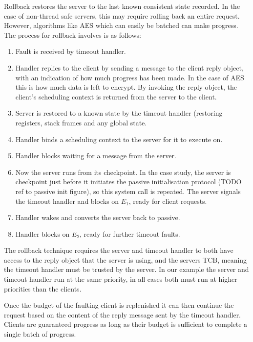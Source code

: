 Rollback restores the server to the last known consistent state recorded. In the case of non-thread
safe servers, this may require rolling back an entire request. However, algorithms like \gls{AES}
which can easily be batched can make progress. The process for rollback involves is as follows:

\begin{enumerate}\label{e:rollback}
    \item Fault is received by timeout handler.
    \item Handler replies to the client by sending a message to the client reply
        object, with an indication of how much progress has been made. In the case of \gls{AES} this
        is how much data is left to encrypt. By invoking the reply object, the client's
        scheduling context is returned from the server to the client.
    \item Server is restored to a known state by the timeout handler (restoring registers, stack
        frames and any global state. 
    \item Handler binds a scheduling context to the server for it to execute on.
    \item Handler blocks waiting for a message from the server.
    \item Now the server runs from its checkpoint. In the case study, the server is checkpoint just
        before it initiates the passive initialisation protocol (TODO ref to passive init figure), so this system call is
        repeated. The server signals the timeout handler and blocks on $E_{1}$, ready for client
        requests.
    \item Handler wakes and converts the server back to passive.
    \item Handler blocks on $E_{2}$, ready for further timeout faults.
\end{enumerate}

The rollback technique requires the server and timeout handler to both have access to the reply
object that the server is using, and the servers \gls{TCB}, meaning the timeout handler must be
trusted by the server. In our example the server and timeout handler run at the same priority, in
all cases both must run at higher priorities than the clients. 

Once the budget of the faulting client is replenished it can then continue the request based on the
content of the reply message sent by the timeout handler. Clients are guaranteed progress as long as
their budget is sufficient to complete a single batch of progress.

